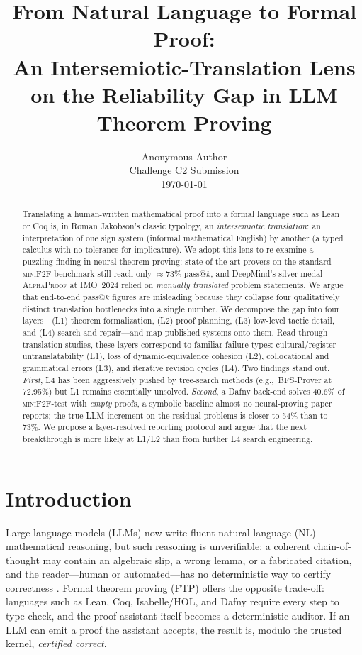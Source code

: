 \documentclass[11pt,letterpaper]{article}
\title{\bfseries From Natural Language to Formal Proof:\\
       An Intersemiotic-Translation Lens on the Reliability Gap
       in LLM Theorem Proving\vspace{-1ex}}
\author{Anonymous Author\\
        Challenge C2 Submission\\
        \today}
\date{}
\begin{document}
\maketitle

\begin{abstract}
\noindent
Translating a human-written mathematical proof into a formal language
such as Lean or Coq is, in Roman Jakobson's classic typology, an
\emph{intersemiotic translation}: an interpretation of one
sign system (informal mathematical English) by another (a typed
calculus with no tolerance for implicature). We adopt this lens to
re-examine a puzzling finding in neural theorem proving: state-of-the-art
provers on the standard \textsc{miniF2F} benchmark still reach only
$\approx$73\% pass@$k$, and DeepMind's silver-medal \textsc{AlphaProof}
at IMO~2024 relied on \emph{manually translated} problem statements.
We argue that end-to-end pass@$k$ figures are misleading because they
collapse four qualitatively distinct translation bottlenecks into a
single number. We decompose the gap into four layers---(L1) theorem
formalization, (L2) proof planning, (L3) low-level tactic detail, and
(L4) search and repair---and map published systems onto them. Read
through translation studies, these layers correspond to familiar
failure types: cultural/register untranslatability (L1), loss of
dynamic-equivalence cohesion (L2), collocational and grammatical errors
(L3), and iterative revision cycles (L4). Two findings stand out.
\emph{First}, L4 has been aggressively pushed by tree-search methods
(e.g.,~BFS-Prover at 72.95\%) but L1 remains essentially unsolved.
\emph{Second}, a Dafny back-end solves 40.6\% of \textsc{miniF2F}-test
with \emph{empty} proofs, a symbolic baseline almost no neural-proving
paper reports; the true LLM increment on the residual problems is
closer to 54\% than to 73\%. We propose a layer-resolved reporting
protocol and argue that the next breakthrough is more likely at L1/L2
than from further L4 search engineering.
\end{abstract}

\section{Introduction}
\label{sec:intro}

Large language models (LLMs) now write fluent natural-language (NL)
mathematical reasoning, but such reasoning is unverifiable: a coherent
chain-of-thought may contain an algebraic slip, a wrong lemma, or a
fabricated citation, and the reader---human or automated---has no
deterministic way to certify correctness
\cite{mao2024champ,frieder2023ghosts,collins2023checkmate}. Formal theorem proving (FTP)
offers the opposite trade-off: languages such as Lean, Coq, Isabelle/HOL,
and Dafny require every step to type-check, and the proof assistant
itself becomes a deterministic auditor. If an LLM can emit a proof
the assistant accepts, the result is, modulo the trusted kernel,
\emph{certified correct}.
\end{document}
